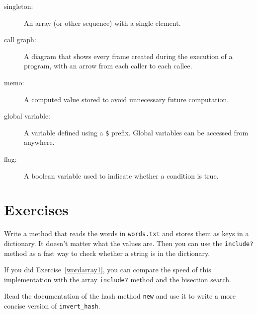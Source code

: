 \documentclass[10pt]{book}
\begin{document}
\begin{description}
\item[singleton:] An array (or other sequence) with a single element.

\item[call graph:] A diagram that shows every frame created during
the execution of a program, with an arrow from each caller to
each callee. 

\item[memo:] A computed value stored to avoid unnecessary future 
computation.

\item[global variable:]  A variable defined using a {\tt \$} prefix.  Global
variables can be accessed from anywhere.


\item[flag:] A boolean variable used to indicate whether a condition
is true.


\end{description}


\section{Exercises}

\begin{exercise}
\label{wordlist2}

Write a method that reads the words in {\tt words.txt} and
stores them as keys in a dictionary.  It doesn't matter what the
values are.  Then you can use the {\tt include?} method
as a fast way to check whether a string is in
the dictionary.

If you did Exercise~\ref{wordarray1}, you can compare the speed
of this implementation with the array {\tt include?} method and the
bisection search.

\end{exercise}


\begin{exercise}
\label{setdefault}

Read the documentation of the hash method {\tt new}
and use it to write a more concise version of \verb"invert_hash".

\end{exercise}
\end{document}
